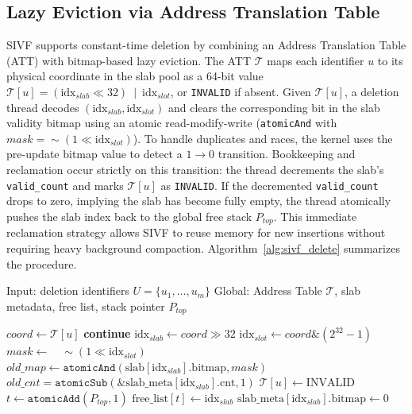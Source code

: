 \documentclass[sigconf,nonacm]{acmart}
\theoremstyle{plain}
\theoremstyle{definition}
\theoremstyle{remark}
\begin{document}
\subsection{Lazy Eviction via Address Translation Table}
\label{sec:bitmap_lazy_eviction}

SIVF supports constant-time deletion by combining an Address Translation Table (ATT) with bitmap-based lazy eviction.
The ATT $\mathcal{T}$ maps each identifier $u$ to its physical coordinate in the slab pool as a 64-bit value
$\mathcal{T}[u] = (\text{idx}_{slab} \ll 32)\ \mid\ \text{idx}_{slot}$,
or \texttt{INVALID} if absent. Given $\mathcal{T}[u]$, a deletion thread decodes $(\text{idx}_{slab},\text{idx}_{slot})$ and
clears the corresponding bit in the slab validity bitmap using an atomic read-modify-write
(\texttt{atomicAnd} with $mask=\sim(1\ll \text{idx}_{slot})$). To handle duplicates and races, the kernel uses the pre-update bitmap value
to detect a $1\rightarrow 0$ transition. Bookkeeping and reclamation occur strictly on this transition: the thread decrements
the slab's \texttt{valid\_count} and marks $\mathcal{T}[u]$ as \texttt{INVALID}. If the decremented \texttt{valid\_count}
drops to zero, implying the slab has become fully empty, the thread atomically pushes the slab index back to the global free stack
$P_{top}$. This immediate reclamation strategy allows SIVF to reuse memory for new insertions without requiring heavy background compaction.
Algorithm~\ref{alg:sivf_delete} summarizes the procedure.

\begin{algorithm}[t]
\caption{Lazy eviction with slab-wise reclamation in SIVF}
\label{alg:sivf_delete}
\begin{algorithmic}[1]
\State Input: deletion identifiers $U=\{u_1,\ldots,u_m\}$
\State Global: Address Table $\mathcal{T}$, slab metadata, free list, stack pointer $P_{top}$

    \State $coord \gets \mathcal{T}[u]$
     \State \textbf{continue} \EndIf
    \State $\text{idx}_{slab} \gets coord \gg 32$
    \State $\text{idx}_{slot} \gets coord \mathbin{\&} (2^{32}-1)$
    \State $mask \gets \quad \sim(1 \ll \text{idx}_{slot})$
    \State $old\_map \gets \texttt{atomicAnd}(\text{slab}[\text{idx}_{slab}].\text{bitmap}, mask)$
        \State $old\_cnt = \texttt{atomicSub}(\&\text{slab\_meta}[\text{idx}_{slab}].\text{cnt}, 1)$
        \State $\mathcal{T}[u] \gets \text{INVALID}$
             \State $t \gets \texttt{atomicAdd}(P_{top}, 1)$
             \State $\text{free\_list}[t] \gets \text{idx}_{slab}$
             \State $\text{slab\_meta}[\text{idx}_{slab}].\text{bitmap} \gets 0$
        \EndIf
    \EndIf
\EndFor
\end{algorithmic}
\end{algorithm}
\end{document}
